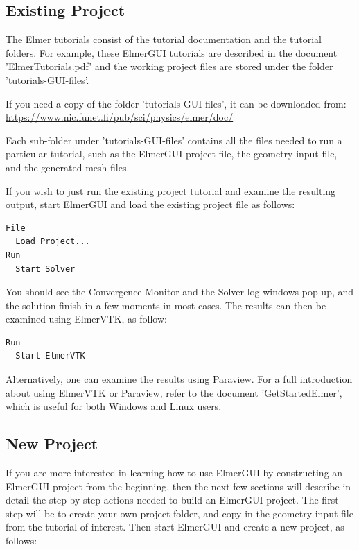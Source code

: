 \subsection*{Existing Project}

The Elmer tutorials consist of the tutorial documentation and the tutorial folders.  For example, these ElmerGUI tutorials are described in the document 'ElmerTutorials.pdf' and the working project files are stored under the folder 'tutorials-GUI-files'.  

If you need a copy of the folder 'tutorials-GUI-files', it can be downloaded from:  \url{https://www.nic.funet.fi/pub/sci/physics/elmer/doc/}

Each sub-folder under 'tutorials-GUI-files' contains all the files needed to run a particular tutorial, such as the ElmerGUI project file, the geometry input file, and the generated mesh files.  

If you wish to just run the existing project tutorial and examine the resulting output, start ElmerGUI and load the existing project file as follows:

\begin{verbatim}
File
  Load Project...
Run
  Start Solver
\end{verbatim}

You should see the Convergence Monitor and the Solver log windows pop up, and the solution finish in a few moments in most cases.  The results can then be examined using ElmerVTK, as follow:

\begin{verbatim}
Run
  Start ElmerVTK
\end{verbatim}

Alternatively, one can examine the results using Paraview.  For a full introduction about using ElmerVTK or Paraview, refer to the document 'GetStartedElmer', which is useful for both Windows and Linux users.

\subsection*{New Project}

If you are more interested in learning how to use ElmerGUI by constructing an ElmerGUI project from the beginning, then the next few sections will describe in detail the step by step actions needed to build an ElmerGUI project.  The first step will be to create your own project folder, and copy in the geometry input file from the tutorial of interest.  Then start ElmerGUI and create a new project, as follows:

